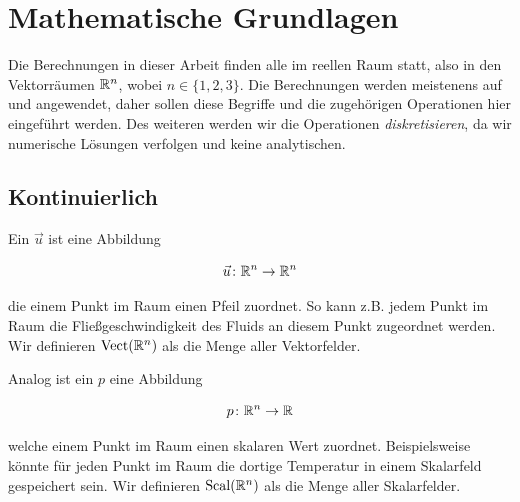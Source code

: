 \section{Mathematische Grundlagen}

Die Berechnungen in dieser Arbeit finden alle im reellen Raum statt, also in den
Vektorräumen $\mathbb{R}^n$, wobei $n \in \{1,2,3\}$. Die Berechnungen werden meistenens
auf  und 
angewendet, daher sollen diese Begriffe und die zugehörigen Operationen hier
eingeführt werden. Des weiteren werden wir die Operationen
\emph{diskretisieren}, da wir numerische Lösungen verfolgen und keine
analytischen.

\subsection{Kontinuierlich}

Ein  $\vec{u}$ ist eine Abbildung

\begin{equation*}
\vec{u} \colon \mathbb{R}^n \to \mathbb{R}^n
\end{equation*}

die einem Punkt im Raum einen Pfeil zuordnet. So kann z.B. jedem Punkt im Raum
die Fließgeschwindigkeit des Fluids an diesem Punkt zugeordnet werden. Wir
definieren $\operatorname*{Vect}(\mathbb{R}^n)$ als die Menge aller
Vektorfelder.

Analog ist ein  $p$ eine Abbildung

\begin{equation*}
p \colon \mathbb{R}^n \to \mathbb{R}
\end{equation*}

welche einem Punkt im Raum einen skalaren Wert zuordnet. Beispielsweise könnte
für jeden Punkt im Raum die dortige Temperatur in einem Skalarfeld gespeichert
sein. Wir definieren $\operatorname*{Scal}(\mathbb{R}^n)$ als die Menge aller
Skalarfelder.

